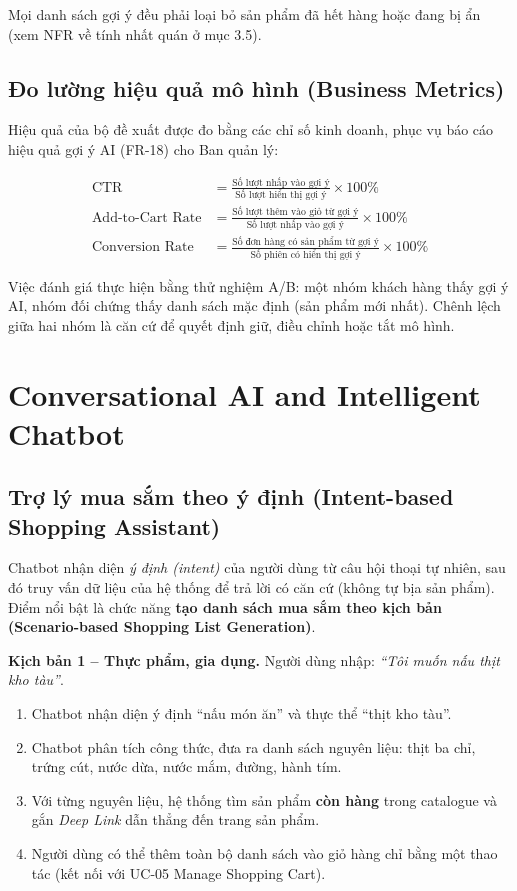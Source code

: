 \documentclass[12pt,a4paper,oneside]{report}
\begin{document}
Mọi danh sách gợi ý đều phải loại bỏ sản phẩm đã hết hàng hoặc đang bị ẩn (xem NFR về tính nhất quán ở mục 3.5).

\subsection{Đo lường hiệu quả mô hình (Business Metrics)}

Hiệu quả của bộ đề xuất được đo bằng các chỉ số kinh doanh, phục vụ báo cáo hiệu quả gợi ý AI (FR-18) cho Ban quản lý:

\begin{align}
\text{CTR} &= \frac{\text{Số lượt nhấp vào gợi ý}}{\text{Số lượt hiển thị gợi ý}} \times 100\% \\
\text{Add-to-Cart Rate} &= \frac{\text{Số lượt thêm vào giỏ từ gợi ý}}{\text{Số lượt nhấp vào gợi ý}} \times 100\% \\
\text{Conversion Rate} &= \frac{\text{Số đơn hàng có sản phẩm từ gợi ý}}{\text{Số phiên có hiển thị gợi ý}} \times 100\%
\end{align}

Việc đánh giá thực hiện bằng thử nghiệm A/B: một nhóm khách hàng thấy gợi ý AI, nhóm đối chứng thấy danh sách mặc định (sản phẩm mới nhất). Chênh lệch giữa hai nhóm là căn cứ để quyết định giữ, điều chỉnh hoặc tắt mô hình.

\section{Conversational AI and Intelligent Chatbot}

\subsection{Trợ lý mua sắm theo ý định (Intent-based Shopping Assistant)}

Chatbot nhận diện \emph{ý định (intent)} của người dùng từ câu hội thoại tự nhiên, sau đó truy vấn dữ liệu của hệ thống để trả lời có căn cứ (không tự bịa sản phẩm). Điểm nổi bật là chức năng \textbf{tạo danh sách mua sắm theo kịch bản (Scenario-based Shopping List Generation)}.

\textbf{Kịch bản 1 -- Thực phẩm, gia dụng.} Người dùng nhập: \emph{``Tôi muốn nấu thịt kho tàu''}.

\begin{enumerate}
  \item Chatbot nhận diện ý định ``nấu món ăn'' và thực thể ``thịt kho tàu''.
  \item Chatbot phân tích công thức, đưa ra danh sách nguyên liệu: thịt ba chỉ, trứng cút, nước dừa, nước mắm, đường, hành tím.
  \item Với từng nguyên liệu, hệ thống tìm sản phẩm \textbf{còn hàng} trong catalogue và gắn \emph{Deep Link} dẫn thẳng đến trang sản phẩm.
  \item Người dùng có thể thêm toàn bộ danh sách vào giỏ hàng chỉ bằng một thao tác (kết nối với UC-05 Manage Shopping Cart).
\end{enumerate}
\end{document}
